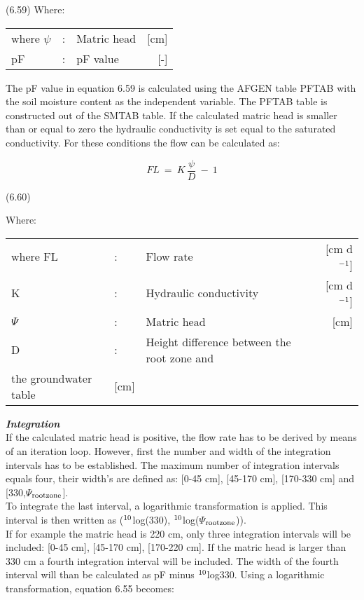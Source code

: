  
\strut\hfill (6.59)
Where:\\
\begin{tabularx}{\textwidth}{llXr}



where $\psi$ &:& Matric head  & [cm]\\
pF &:& pF value  & [-]
\end{tabularx}


The pF value in equation 6.59 is calculated using the AFGEN table PFTAB with the soil
moisture content as the independent variable. The PFTAB table is constructed out of the
SMTAB table. If the calculated matric head is smaller than or equal to zero the hydraulic
conduc\-tivity is set equal to the saturated conductivity. For these conditions the flow can
be calculat\-ed as:

\begin{equation}
FL~=~K\,{\frac{\psi }{D}} ~-~ 1
\end{equation}

 
\strut\hfill (6.60)

Where:\\
\begin{tabularx}{\textwidth}{llXr}



where FL &:& Flow rate  & [cm d$^{{\rm -1}}$]\\
K  &:& Hydraulic conductivity  & [cm d$^{{\rm -1}}$]\\
$\Psi$ &:& Matric head  & [cm]\\
D &:& Height difference between the root zone and \\
  the groundwater table  & [cm]
\end{tabularx}



{\bf {\it Integration\/}}\\
If the calculated matric head is positive, the flow rate has to be derived by means of an
iteration loop. However, first the number and width of the integration intervals has to be
established. The maximum number of integration intervals equals four, their width's are
defined as: [0-45 cm], [45-170 cm], [170-330 cm] and [330,$\Psi$$_{{\rm rootzone}}$].\\
To integrate the last interval, a logarithmic transformation is applied. This interval is then
written as ($^{{\rm 10}}$log(330), $^{{\rm 10}}$log($\Psi$$_{{\rm rootzone}}$)).\\
If for example the matric head is 220 cm, only three integration intervals will be
included: [0-45 cm], [45-170 cm], [170-220 cm]. If the matric head is larger than 330 cm
a fourth integration interval will be included. The width of the fourth interval will than be
calculated as pF minus $^{{\rm 10}}$log330. Using a logarithmic transformation, equation 6.55
becomes:

